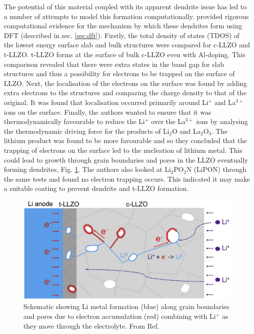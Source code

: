 \documentclass[../main.tex]{subfiles}
\begin{document}
The potential of this material coupled with its apparent dendrite issue has led to a number of attempts to model this formation computationally\cite{Canepa2018, Tian2018, Gao2020}. \citeauthor{Tian2018} provided rigorous computational evidence for the mechanism by which these dendrites form using DFT (described in sec. \ref{sec:dft}). \cite{Tian2018} Firstly, the total density of states (TDOS) of the lowest energy surface slab and bulk structures were compared for c-LLZO and t-LLZO. t-LLZO forms at the surface of bulk c-LLZO even with Al-doping\cite{Ma2016, Rettenwander2018}. This comparison revealed that there were extra states in the band gap for slab structures and thus a possibility for electrons to be trapped on the surface of LLZO. Next, the localisation of the electrons on the surface was found by adding extra electrons to the structures and comparing the charge density to that of the original. It was found that localisation occurred primarily around Li$^+$ and La$^{3+}$ ions on the surface. Finally, the authors wanted to ensure that it was thermodynamically favourable to reduce the Li$^+$ over the La$^{3+}$ ions by analysing the thermodynamic driving force for the products of Li$_2$O and La$_2$O$_3$. The lithium product was found to be more favourable and so they concluded that the trapping of electrons on the surface led to the nucleation of lithium metal. This could lead to growth through grain boundaries and pores in the LLZO eventually forming dendrites\cite{Ren2015}, Fig. \ref{fig:tian2020}. The authors also looked at Li$_2$PO$_2$N (LiPON) through the same tests and found no electron trapping occurs. This indicated it may make a suitable coating to prevent dendrite and t-LLZO formation.

\begin{figure}[H]
    \centering
    \includegraphics{figures/tian_grain_growth.png}
    \caption{Schematic showing Li metal formation (blue) along grain boundaries and pores due to electron accumulation (red) combining with Li$^+$ as they move through the electrolyte. From Ref. }
    \label{fig:tian2020}
\end{figure}
\end{document}
